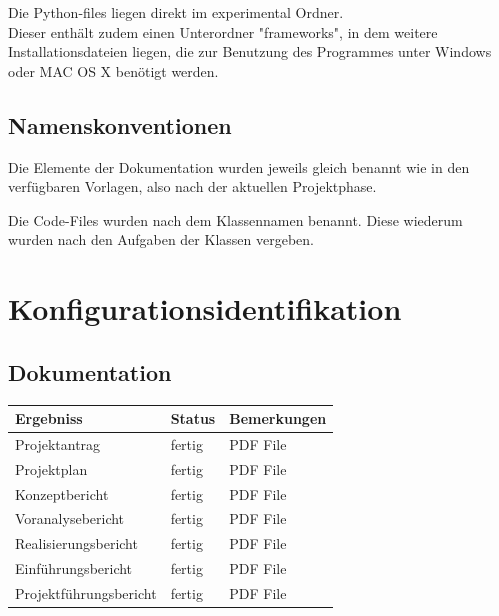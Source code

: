 \documentclass[10pt,paper=a4,final]{scrartcl}
\begin{document}
Die Python-files liegen direkt im experimental Ordner.\\
Dieser enth\"alt zudem einen Unterordner "frameworks", in dem weitere Installationsdateien liegen, die zur Benutzung des Programmes unter Windows oder MAC OS X ben\"otigt werden.
\subsection{Namenskonventionen}
Die Elemente der Dokumentation wurden jeweils gleich benannt wie in den verf\"ugbaren Vorlagen, also nach der aktuellen Projektphase.

Die Code-Files wurden nach dem Klassennamen benannt. Diese wiederum wurden nach den Aufgaben der Klassen vergeben.
\section{Konfigurationsidentifikation}
\subsection{Dokumentation}
\begin{tabularx}{\textwidth}{|l|l|X|}
\hline
 \bf Ergebniss \cellcolor{blue!20!}& \bf Status \cellcolor{blue!20!}& \bf Bemerkungen \cellcolor{blue!20!} \\ \hline
Projektantrag & fertig \cellcolor{green} & PDF File\\ \hline
Projektplan & fertig \cellcolor{green}& PDF File \\ \hline
Konzeptbericht & fertig \cellcolor{green}& PDF File \\ \hline
Voranalysebericht & fertig \cellcolor{green}& PDF File \\ \hline
Realisierungsbericht & fertig \cellcolor{green}& PDF File \\ \hline
Einf\"uhrungsbericht & fertig \cellcolor{green}& PDF File \\ \hline
Projektf\"uhrungsbericht & fertig \cellcolor{green}& PDF File \\ \hline
\end{tabularx}
\end{document}
